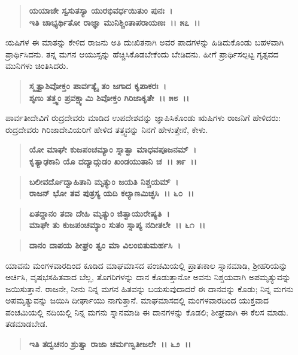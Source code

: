 \begin{verse}
\textbf{ಯಯಾಚೇ ಸ್ವಸುತಸ್ಯಾ ಯುರಭಿವರ್ಧಯಿತುಂ ಪುನಃ~।}\\\textbf{ಇತಿ ಚಾಭ್ಯರ್ಥಿತೋ ರಾಜ್ಞಾ ಮುನಿಶ್ಚಿಂತಾಪರಾಯಣಃ~।। ೫೭~।।}
\end{verse}

ಋಷಿಗಳ ಈ ಮಾತನ್ನು ಕೇಳಿದ ರಾಜನು ಅತಿ ದುಃಖಿತನಾಗಿ ಅವರ ಪಾದಗಳನ್ನು ಹಿಡಿದುಕೊಂಡು ಬಹಳವಾಗಿ ಪ್ರಾರ್ಥಿಸಿದನು. ತನ್ನ ಮಗನ ಆಯುಸ್ಸನ್ನು ಹೆಚ್ಚಿಸಿಕೊಡಬೇಕೆಂದು ಬೇಡಿದನು. ಹೀಗೆ ಪ್ರಾರ್ಥಿಸಲ್ಪಟ್ಟ ಗೃತ್ಸವದ ಮುನಿಗಳು ಚಿಂತಿಸಿದರು.

\begin{verse}
\textbf{ಸ್ಮೃತ್ವಾಶಿವೋಕ್ತಂ ಪಾರ್ವತ್ಯೈ ತಂ ಜಗಾದ ಕೃಪಾಕರಃ~।}\\\textbf{ಶೃಣು ತತ್ತ್ವಂ ಪ್ರವಕ್ಷ್ಯಾಮಿ ಶಿವೋಕ್ತಂ ಗಿರಿಜಾಕೃತೇ~।। ೫೮~।।}
\end{verse}

ಪಾರ್ವತೀದೇವಿಗೆ ರುದ್ರದೇವರು ಮಾಡಿದ ಉಪದೇಶವನ್ನು ಜ್ಞಾಪಿಸಿಕೊಂಡು ಋಷಿಗಳು ರಾಜನಿಗೆ ಹೇಳಿದರು: ರುದ್ರದೇವರು ಗಿರಿಜಾದೇವಿಯರಿಗೆ ಹೇಳಿದ ತತ್ತ್ವವನ್ನು ನಿನಗೆ ಹೇಳುತ್ತೇನೆ, ಕೇಳು.

\begin{verse}
\textbf{ಯೋ ಮಾಘೇ ಕುಜಪಂಚಮ್ಯಾಂ ಸ್ನಾತ್ವಾ ಮಾಧವಪೂಜನಮ್~।}\\\textbf{ಕೃತ್ಯಾಢಕಾನಿ ಯೊ ದದ್ಯಾದ್ಗುಡಂ ಖಂಡಯುತಾನಿ ಚ~।। ೫೯~।।} 
\end{verse}

\begin{verse}
\textbf{ಬಲೀವರ್ದೊದ್ವಾಹಿತಾನಿ ಮೃತ್ಯುಂ ಜಯತಿ ನಿಶ್ಚಯಮ್~।}\\\textbf{ರಾಜನ್ ಭೋ ತವ ಪುತ್ರಸ್ಯ ಯದಿ ಕಲ್ಯಾಣಮಿಚ್ಛಸಿ~।। ೬೦~।। }
\end{verse}

\begin{verse}
\textbf{ಏತದ್ದಾನಂ ತದಾ ದೇಹಿ ಮೃತ್ಯುಂ ಜಿತ್ವಾಯುರೇಷ್ಯತಿ~।}\\\textbf{ಮಾಘೇ ತು ಕುಜಪಂಚಮ್ಯಾಂ ಸುತಂ ಸ್ನಾಪ್ಯ ನದೀತಲೇ~।। ೬೧~।। }
\end{verse}

\begin{verse}
\textbf{ದಾನಂ ದಾಪಯ ಶೀಘ್ರಂ ತ್ವಂ ಮಾ ವಿಲಂಬಿತುಮರ್ಹಸಿ~।}
\end{verse}

ಯಾವನು ಮಂಗಳವಾರದಿಂದ ಕೂಡಿದ ಮಾಘಮಾಸದ ಪಂಚಮಿಯಲ್ಲಿ ಪ್ರಾತಃಕಾಲ ಸ್ನಾನಮಾಡಿ, ಶ‍್ರೀಹರಿಯನ್ನು ಅರ್ಚಿಸಿ, ವೃಷಭಸಹಿತವಾದ ಬೆಲ್ಲ, ತೊಗರಿಗಳನ್ನು ದಾನ ಕೊಡುತ್ತಾನೋ ಅವನು ನಿಶ್ಚಯವಾಗಿ ಅಪಮೃತ್ಯುವನ್ನು ಜಯಿಸುತ್ತಾನೆ. ರಾಜನೇ, ನೀನು ನಿನ್ನ ಮಗನ ಹಿತವನ್ನು ಬಯಸುವುದಾದರೆ ಈ ದಾನವನ್ನು ಕೊಡು; ನಿನ್ನ ಮಗನು ಅಪಮೃತ್ಯುವನ್ನು ಜಯಿಸಿ ದೀರ್ಘಾಯು ನಾಗುತ್ತಾನೆ. ಮಾಘಮಾಸದಲ್ಲಿ ಮಂಗಳವಾರದಿಂದ ಯುಕ್ತವಾದ ಪಂಚಮಿಯಲ್ಲಿ ನದಿಯಲ್ಲಿ ನಿನ್ನ ಮಗನು ಸ್ನಾನಮಾಡಿ ಈ ದಾನಗಳನ್ನು ಕೊಡಲಿ; ಶೀಘ್ರವಾಗಿ ಈ ಕೆಲಸ ಮಾಡು. ತಡಮಾಡಬೇಡ.

\begin{verse}
\textbf{ಇತಿ ತದ್ವಚನಂ ಶ್ರುತ್ವಾ ರಾಜಾ ಚರ್ಮಣ್ವತೀಜಲೇ~।। ೬೨~।।} 
\end{verse}

